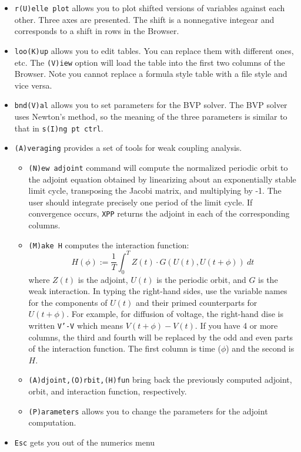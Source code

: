 \documentclass{article}
\begin{document}
\begin{itemize}
\item{\tt r(U)elle plot} allows you to plot shifted versions of variables against each other. Three axes are presented. The shift is a nonnegative integear and corresponds to a shift in rows in the Browser.
\item{\tt loo(K)up} allows you to edit tables. You can replace them with different ones, etc. The {\tt (V)iew} option will load the table into the first two columns of the Browser. Note you cannot replace a formula style table with a file style and vice versa.
\item{\tt bnd(V)al} allows you to set parameters for the BVP solver. The BVP solver uses Newton's method, so the meaning of the three parameters is similar to that in {\tt s(I)ng pt ctrl}. 
\item{\tt (A)veraging} provides a set of tools for weak coupling analysis. 
\begin{itemize}
\item {\tt (N)ew adjoint} command will compute the normalized periodic orbit to the adjoint equation obtained by linearizing about an exponentially stable limit cycle, transposing the Jacobi matrix, and multiplying by -1. The user should integrate precisely one period of the limit cycle. If convergence occurs, {\tt XPP} returns the adjoint in each of the corresponding columns. 
\item {\tt (M)ake H} computes the interaction function:
\[
H(\phi) := \frac{1}{T} \int_0^T Z(t)\cdot G(U(t),U(t+\phi))\ dt
\]
where $Z(t)$ is the adjoint, $U(t)$ is the periodic orbit, and $G$ is the weak interaction. In typing the right-hand sides, use the variable names for the components of $U(t)$ and their primed counterparts for $U(t+\phi).$ For example, for diffusion of voltage, the right-hand dise is written {\tt V'-V} which means $V(t+\phi)-V(t).$  If you have 4 or more columns, the third and fourth will be replaced by the odd and even parts of the interaction function. The first column is time ($\phi$)  and the second is $H$.  
\item {\tt (A)djoint,(O)rbit,(H)fun} bring back the previously computed adjoint, orbit, and interaction function, respectively. 
\item {\tt (P)arameters} allows you to change the parameters for the adjoint computation.
\end{itemize}
\item {\tt Esc} gets you out of the numerics menu
\end{itemize}
\end{document}
